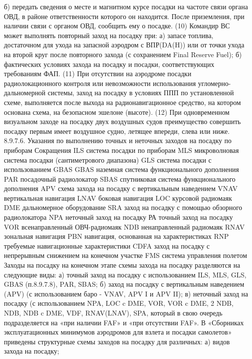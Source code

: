 б)	передать сведения о месте и магнитном курсе посадки на частоте связи органа ОВД, в районе ответственности которого он находится. 
После приземления, при наличии связи с органом ОВД, сообщить ему о посадке. 
(10) Командир ВС может выполнять повторный заход на посадку при:
а)	запасе топлива, достаточном для ухода на запасной аэродром с ВПР(DA(H)) или от точки ухода на второй круг после повторного захода (с сохранением Final Reserve Fuel);
б)	фактических условиях захода на посадку и посадки, соответствующих требованиям ФАП.
(11) При отсутствии на аэродроме посадки радиолокационного контроля или невозможности использования угломерно-дальномерной системы, заход на посадку в условиях ППП по установленной схеме, выполняется после выхода на радионавигационное средство, на котором основана схема, на безопасном эшелоне (высоте).
(12) При одновременном визуальном заходе на посадку двух воздушных судов преимущество совершить посадку первым имеет воздушное судно, летящее впереди, слева или ниже.
8.9.7.6.	Указания по выполнению точных и неточных заходов на посадку по приборам
Сокращения
ILS       система посадки по приборам
MLS     микроволновая система посадки (сантиметрового диапазона)
GLS     система посадки с использованием GBAS
GBAS  наземная система функционального дополнения
PAR     посадочный радиолокатор
SBAS   спутниковая система функционального дополнения
APV     схема захода на посадку с вертикальным наведением
VNAV вертикальная навигация
LNAV боковая навигация
LOC   курсовой радиомаяк
DME   дальномерное оборудование
SRA   заход на посадку с помощью обзорного радиолокатора
NPA   неточный заход на посадку
РА      точный заход на посадку
VOR   всенаправленный ОВЧ-радиомаяк
NDB   ненаправленный радиомаяк
RNAV зональная навигация
PBN   навигация, основанная на характеристиках
RNP   требуемые навигационные характеристики
CDFA заход на посадку с непрерывным снижением на конечном участке
FMS    система управления полетом
Заходы на посадку на конечном этапе схемы захода на посадку разделяются на следующие виды:
а)	точный заход на посадку с использованием ILS, MLS, GLS, GBAS (п.8.9.7.8), PAR, SBAS;
б)	заход на посадку с вертикальным наведением (APV) (с использованием баро - VNAV, APV I и APV II);
в)	неточный заход на посадку (с использованием NPA, LOC c DME, VOR, VOR c DME, 2 NDB, NDB, NDB c DME, VDF, RNAV(LNAV), SPA, который в свою очередь подразделяется на «при наличии FAF» и «при отсутствии FAF».
В «Сборниках эксплуатационных минимумов аэродромов для взлета и посадки самолетов» приведены структурные схемы заходов на посадку для различных:
а)	видов захода на посадку;
